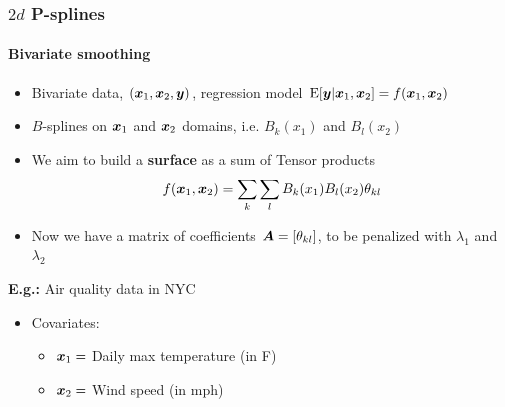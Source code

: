 \documentclass[11pt]{beamer}
\newcommand{\nologo}{\setbeamertemplate{logo}{}}
\newcommand{\bfx}{\mbox{\boldmath $x$}}
\newcommand{\bfy}{\mbox{\boldmath $y$}}
\newcommand{\bfA}{\mbox{\boldmath $A$}}
\begin{document}
{\nologo
\begin{frame}
 \frametitle{$2d$ P-splines}
 	\framesubtitle{Bivariate smoothing}
 \vspace{-.10cm}
{\scriptsize
\begin{itemize}
\item Bivariate data, $(\bfx_1,\bfx_2,\bfy)$, regression model $\mbox{E}[\bfy|\bfx_1,\bfx_2] = f(\bfx_1,\bfx_2)$ %

\item $B$-splines on $\bfx_1$ and $\bfx_2$ domains, i.e. $B_k(x_1)$ and $B_l(x_2)$ %

\item We aim to build a {\bf surface} as a \alert{sum of Tensor products} 
\vspace{-.1cm}
\[
f(\bfx_1,\bfx_2) = \sum_k \sum_l B_k(x_1) B_l(x_2) \theta_{kl}
\]\vspace{-.5cm}
\item Now we have a matrix of coefficients $\bfA=[\theta_{kl}]$, to be penalized with $\lambda_1$ and $\lambda_2$
\end{itemize}
}
%
\vspace{-.0cm}

{\footnotesize
{\bf E.g.:} Air quality data in NYC

\begin{minipage}[c]{.55\columnwidth}
\vspace{-.55in}
\begin{itemize}
\item Covariates: 
\begin{itemize}
\item \scriptsize$\bfx_1 = $ Daily max temperature (in F)
\item \scriptsize$\bfx_2 = $ Wind speed (in mph)
\end{itemize}
\vfill
\vfill

\end{itemize}
\end{minipage}
\begin{minipage}[c]{.4\columnwidth}
\begin{center}
\end{center}
\end{minipage}
}

\end{frame}
}
\end{document}
